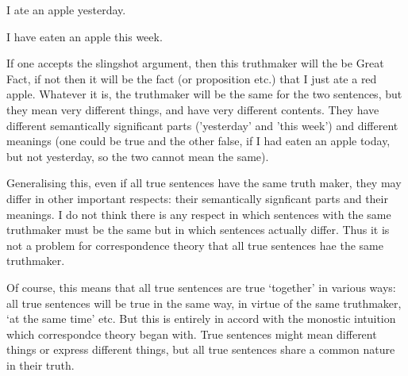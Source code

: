 	\begin{example} \label{yesterday} 
	I ate an apple yesterday. 
	\end{example}

	\begin{example} \label{week} 
	I have eaten an apple this week.
	\end{example}

If one accepts the slingshot argument, then this truthmaker will the be Great Fact, if not then it will be the fact (or proposition etc.) that I just ate a red apple.
Whatever it is, the truthmaker will be the same for the two sentences, but they mean very different things, and have very different contents.
They have different semantically significant parts ('yesterday' and 'this week') and different meanings (one could be true and the other false, if I had eaten an apple today, but not yesterday, so the two cannot mean the same).

Generalising this, even if all true sentences have the same truth maker, they may differ in other important respects: their semantically signficant parts and their meanings.
I do not think there is any respect in which sentences with the same truthmaker must be the same but in which sentences actually differ.
Thus it is not a problem for correspondence theory that all true sentences hae the same truthmaker.

Of course, this means that all true sentences are true `together' in various ways: all true sentences will be true in the same way, in virtue of the same truthmaker, `at the same time' etc.
But this is entirely in accord with the monostic intuition which correspondce theory began with.
True sentences might mean different things or express different things, but all true sentences share a common nature in their truth.

